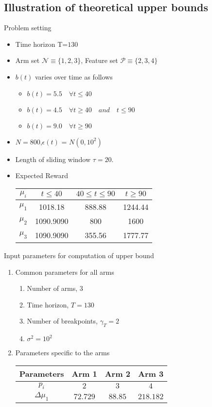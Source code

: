 \documentclass[compress, serif, onlymath, professionalfonts]{beamer}
\begin{document}
\subsection{Illustration of theoretical upper bounds}
\begin{frame}{Problem setting}
\begin{itemize}
\item Time horizon T=$130$
\item Arm set $\mathcal{N} \equiv \{ 1,2,3 \}$,  Feature set $\mathcal{P} \equiv {\{ 2, 3, 4 \}}$
\item $b(t)$ varies over time as follows
\begin{itemize}
\item $b(t)=5.5\quad \forall t \leq 40 $
\item $b(t)=4.5\quad \forall t \geq 40\quad and\quad t \leq 90$
\item $b(t)=9.0\quad \forall t \geq 90$
\end{itemize}
\item $N = 800$,$\epsilon(t)$ = $N(0,10^2)$ 
\item Length of sliding window $\tau = 20.$
\item Expected Reward
\begin{center}
\begin{tabular}{ |c|c|c|c| } 
 \hline
$\mu_i$ &$t \leq 40$  &  $40 \leq t \leq 90$ & $t \geq 90$ \\ 
\hline
 $\mu_1$ & 1018.18 &888.88 & 1244.44\\ 
 \hline
 $\mu_2$ & 1090.9090 &800&1600\\ 
 \hline
 $\mu_3$ & 1090.9090&355.56&1777.77\\
 \hline
\end{tabular}
\end{center}
\end{itemize}
\end{frame}

\begin{frame}{Input parameters for computation of upper bound }
\begin{enumerate}
\item Common parameters for all arms
\begin{enumerate}
\item Number of arms, $3$
\item Time horizon, $T=130$
\item Number of breakpoints, $\gamma_T=2$
\item $\sigma^2=10^2$
\end{enumerate}
\item Parameters specific to the arms
\begin{center}
\begin{tabular}{ |c|c|c|c| } 
 \hline
Parameters & Arm 1  &  Arm 2 & Arm 3 \\ 
\hline
 $p_i$ & $2$ & $3$ & $4$\\ 
 \hline
 $\Delta\mu_1$ & $72.729$ & $88.85$ & $218.182$\\ 
 \hline
\end{tabular}
\end{center}
\end{enumerate}
\end{frame}
\end{document}
